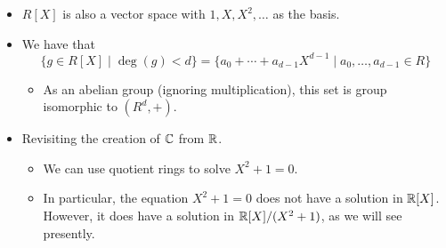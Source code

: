 \documentclass[../notes.tex]{subfiles}
\begin{document}
\begin{itemize}
\begin{proof}
        The existence of the first two maps is obvious (they are just instances of the canonical injection and surjection, respectively).\par\smallskip
        We now verify that the last two sets are in bijective correspondence. Define a map $\varphi$ between them via the canonical surjection (note that since the domain of $\varphi$ is not $R[X]$, we will still have to verify surjectivity here). As established previously, $\varphi$ is well defined.\par
        To prove that $\varphi$ is injective, it will suffice to show that $\ker\varphi=0$. Let $h$ be an arbitrary polynomial in $R[X]$ with $\deg(h)<d$. Suppose $\varphi(h)=0=0+(f)=(f)$. Then $h\in(f)$. It follows that either $h=0$ or $\deg(h)\geq\deg(f)=d$. But as an element of the domain $\deg(h)<d$ by hypothesis. Therefore, $h=0$, as desired.\par
        To prove that $\varphi$ is surjective, it will suffice to show that for every $h+(f)\in R[X]/(f)$, there exists $r\in R[X]$ with $\deg(r)<d$ such that $\varphi(r)=h+(f)$. Let $h+(f)\in R[X]/(f)$ be arbitrary. By the Euclidean algorithm, $h=qf+r$ for some $q,r\in R[X]$ where $\deg(r)<\deg(f)=d$. Moreover, since $r=h+(-q)f$, $r\in h+(f)$ and hence $h+(f)=r+(f)$. Therefore, since $r$ is in the domain of $\varphi$ (as it has degree less than $d$), $\varphi(r)=r+(f)=h+(f)$, as desired.
    \end{proof}
    \item $R[X]$ is also a vector space with $1,X,X^2,\dots$ as the basis.
    \item We have that
    \begin{equation*}
        \{g\in R[X]\mid \deg(g)<d\} = \{a_0+\cdots+a_{d-1}X^{d-1}\mid a_0,\dots,a_{d-1}\in R\}
    \end{equation*}
    \begin{itemize}
        \item As an abelian group (ignoring multiplication), this set is group isomorphic to $(R^d,+)$.
    \end{itemize}
    \item Revisiting the creation of $\mathbb{C}$ from $\mathbb{R}$.
    \begin{itemize}
        \item We can use quotient rings to solve $X^2+1=0$.
        \item In particular, the equation $X^2+1=0$ does not have a solution in $\mathbb{R}[X]$. However, it does have a solution in $\mathbb{R}[X]/(X^2+1)$, as we will see presently.

\end{itemize}
\end{itemize}
\end{document}
